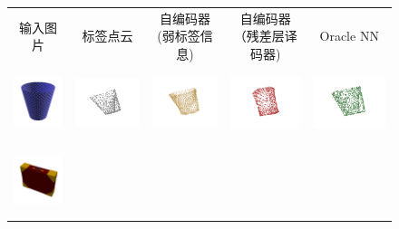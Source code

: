 \documentclass[bachelor, nocolorlinks, printoneside]{seuthesis} %
\begin{document}
\begin{Main}
\begin{figure}[!h]
    \begin{tabular}{c@{}c@{}c@{}c@{}c@{}}
    输入图片 & 标签点云 & \makecell[c]{自编码器 \\(弱标签信息)} & \makecell[c]{自编码器 \\（残差层译码器)} & Oracle NN\\
    	\includegraphics[width=0.11\columnwidth,height=2cm]{figs/real_dataset/Image/ashcan_ff2f13bc0b9d4ade19c52ba9902b5ab0.png} &
    	\includegraphics[width=0.22\columnwidth,height=2cm]{figs/real_dataset/GT/ashcan_ff2f13bc0b9d4ade19c52ba9902b5ab0_gt.png} &
    	\includegraphics[width=0.22\columnwidth,height=2cm]{figs/real_dataset/AE_label/ashcan_ff2f13bc0b9d4ade19c52ba9902b5ab0_fine.png} &
    	\includegraphics[width=0.22\columnwidth,height=2cm]{figs/real_dataset/AE/ashcan_66d96d2428184442ba6cf6cbb9f4c2bb_fine.png} &
    	\includegraphics[width=0.22\columnwidth,height=2cm]{figs/real_dataset/oracle/ashcan_ff2f13bc0b9d4ade19c52ba9902b5ab0_oracle.png} \\
    	\vspace{-5mm}
    	\includegraphics[width=0.11\columnwidth,height=2cm]{figs/real_dataset/Image/bag_8569a0c606bbba73d9985ad45fbb635e.png} &

\end{tabular}
\end{figure}
\end{Main}
\end{document}
